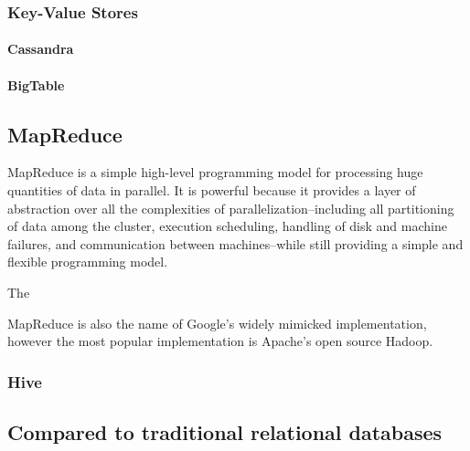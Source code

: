 \documentclass[11pt,a4paper]{article}
\begin{document}
\subsubsection*{Key-Value Stores}
\paragraph*{Cassandra}
\paragraph*{BigTable}

\subsection*{MapReduce}
MapReduce is a simple high-level programming model for processing huge quantities of data in parallel. It is powerful because it provides a layer of abstraction over all the complexities of parallelization--including all partitioning of data among the cluster, execution scheduling, handling of disk and machine failures, and communication between machines--while still providing a simple and flexible programming model.\cite{dean2008mapreduce}

The 

MapReduce is also the name of Google's widely mimicked implementation, however the most popular implementation is Apache's open source Hadoop. 
\subsubsection*{Hive}

\subsection*{Compared to traditional relational databases}

\pagebreak


\end{document}
